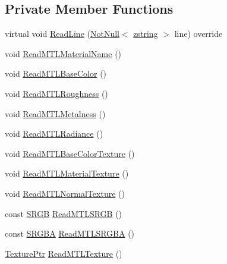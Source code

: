 \subsection*{Private Member Functions}
\begin{DoxyCompactItemize}
\item 
virtual void \mbox{\hyperlink{classmage_1_1rendering_1_1loader_1_1_m_t_l_reader_a54eb83757c915ebca73175e83737cf73}{Read\+Line}} (\mbox{\hyperlink{namespacemage_a8769f9d670d6b585ea306cb1062af94b}{Not\+Null}}$<$ \mbox{\hyperlink{namespacemage_a4163ec9a9a27d5e7f4b452dcb99cb2b9}{zstring}} $>$ line) override
\item 
void \mbox{\hyperlink{classmage_1_1rendering_1_1loader_1_1_m_t_l_reader_ab123422945f5937ffe484c1076a6858b}{Read\+M\+T\+L\+Material\+Name}} ()
\item 
void \mbox{\hyperlink{classmage_1_1rendering_1_1loader_1_1_m_t_l_reader_ae228231b40bc5b8a6fdff3a9a5698530}{Read\+M\+T\+L\+Base\+Color}} ()
\item 
void \mbox{\hyperlink{classmage_1_1rendering_1_1loader_1_1_m_t_l_reader_a01438c92852592fd719a85d146e38b65}{Read\+M\+T\+L\+Roughness}} ()
\item 
void \mbox{\hyperlink{classmage_1_1rendering_1_1loader_1_1_m_t_l_reader_a14aa8cd5655730234c460c6060552f68}{Read\+M\+T\+L\+Metalness}} ()
\item 
void \mbox{\hyperlink{classmage_1_1rendering_1_1loader_1_1_m_t_l_reader_acfafc2485c4b84ef84360e35ac8247eb}{Read\+M\+T\+L\+Radiance}} ()
\item 
void \mbox{\hyperlink{classmage_1_1rendering_1_1loader_1_1_m_t_l_reader_a67198ee5158ee7d77e907f6538030aee}{Read\+M\+T\+L\+Base\+Color\+Texture}} ()
\item 
void \mbox{\hyperlink{classmage_1_1rendering_1_1loader_1_1_m_t_l_reader_a62b4c2d4106fb11f55af6a7de29ad37a}{Read\+M\+T\+L\+Material\+Texture}} ()
\item 
void \mbox{\hyperlink{classmage_1_1rendering_1_1loader_1_1_m_t_l_reader_afc25c8d259af6fbeb06a1e189f247e75}{Read\+M\+T\+L\+Normal\+Texture}} ()
\item 
const \mbox{\hyperlink{structmage_1_1_s_r_g_b}{S\+R\+GB}} \mbox{\hyperlink{classmage_1_1rendering_1_1loader_1_1_m_t_l_reader_aaefa7c67f90d7d592366acdb898993b3}{Read\+M\+T\+L\+S\+R\+GB}} ()
\item 
const \mbox{\hyperlink{structmage_1_1_s_r_g_b_a}{S\+R\+G\+BA}} \mbox{\hyperlink{classmage_1_1rendering_1_1loader_1_1_m_t_l_reader_a5b03c5c7aee393e60ea6c3bd7ff15614}{Read\+M\+T\+L\+S\+R\+G\+BA}} ()
\item 
\mbox{\hyperlink{namespacemage_1_1rendering_a6f3ae54f825328465b0cdde0f0de4a36}{Texture\+Ptr}} \mbox{\hyperlink{classmage_1_1rendering_1_1loader_1_1_m_t_l_reader_abf1609fbd22075fa4e692b7b6eab06fd}{Read\+M\+T\+L\+Texture}} ()
\end{DoxyCompactItemize}
